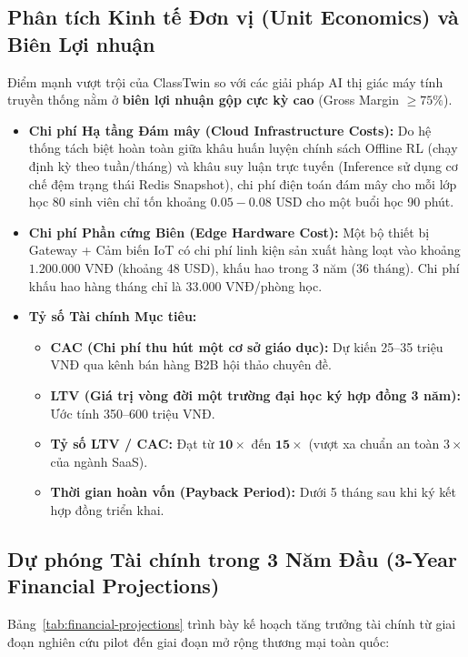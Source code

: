 \subsection{Phân tích Kinh tế Đơn vị (Unit Economics) và Biên Lợi nhuận}\label{subsec:unit-economics}
Điểm mạnh vượt trội của ClassTwin so với các giải pháp AI thị giác máy tính truyền thống nằm ở \textbf{biên lợi nhuận gộp cực kỳ cao} (Gross Margin $\ge 75\%$).
\begin{itemize}
  \item \textbf{Chi phí Hạ tầng Đám mây (Cloud Infrastructure Costs):} Do hệ thống tách biệt hoàn toàn giữa khâu huấn luyện chính sách Offline RL (chạy định kỳ theo tuần/tháng) và khâu suy luận trực tuyến (Inference sử dụng cơ chế đệm trạng thái Redis Snapshot), chi phí điện toán đám mây cho mỗi lớp học 80 sinh viên chỉ tốn khoảng $0.05 - 0.08\text{ USD}$ cho một buổi học 90 phút.
  \item \textbf{Chi phí Phần cứng Biên (Edge Hardware Cost):} Một bộ thiết bị Gateway + Cảm biến IoT có chi phí linh kiện sản xuất hàng loạt vào khoảng $1.200.000\text{ VNĐ}$ (khoảng 48 USD), khấu hao trong 3 năm ($36\text{ tháng}$). Chi phí khấu hao hàng tháng chỉ là $33.000\text{ VNĐ}$/phòng học.
  \item \textbf{Tỷ số Tài chính Mục tiêu:}
  \begin{itemize}
    \item \textbf{CAC (Chi phí thu hút một cơ sở giáo dục):} Dự kiến 25--35 triệu VNĐ qua kênh bán hàng B2B hội thảo chuyên đề.
    \item \textbf{LTV (Giá trị vòng đời một trường đại học ký hợp đồng 3 năm):} Ước tính 350--600 triệu VNĐ.
    \item \textbf{Tỷ số LTV / CAC:} Đạt từ $\mathbf{10\times}$ đến $\mathbf{15\times}$ (vượt xa chuẩn an toàn $3\times$ của ngành SaaS).
    \item \textbf{Thời gian hoàn vốn (Payback Period):} Dưới 5 tháng sau khi ký kết hợp đồng triển khai.
  \end{itemize}
\end{itemize}

\subsection{Dự phóng Tài chính trong 3 Năm Đầu (3-Year Financial Projections)}\label{subsec:du-phong-tai-chinh}
Bảng~\ref{tab:financial-projections} trình bày kế hoạch tăng trưởng tài chính từ giai đoạn nghiên cứu pilot đến giai đoạn mở rộng thương mại toàn quốc:

